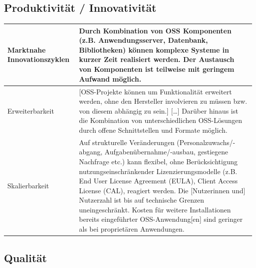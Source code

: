 \documentclass[a4paper]{scrartcl}
\begin{document}
\subsection{Produktivität / Innovativität}

\begin{supertabular}{|m{1.8900598in}m{4.77126in}|}

\hline

Marktnahe Innovationszyklen &

Durch Kombination von OSS Komponenten (z.B. Anwendungsserver, Datenbank,
Bibliotheken) können komplexe Systeme in kurzer Zeit realisiert werden. Der
Austausch von Komponenten ist teilweise mit geringem
Aufwand möglich.\\

\hline

Erweiterbarkeit &

[OSS-Projekte können um Funktionalität erweitert werden, ohne den Hersteller
involvieren zu müssen bzw.  von diesem abhängig zu sein.]  [\ldots] Darüber
hinaus ist die Kombination von unterschiedlichen OSS-Lösungen durch offene
Schnittstellen und Formate möglich.\\

\hline

Skalierbarkeit &

Auf strukturelle Veränderungen (Personalzuwachs/-abgang,
Aufgabenübernahme/-ausbau, gestiegene Nachfrage etc.) kann flexibel, ohne
Berücksichtigung nutzungseinschränkender Lizenzierungsmodelle (z.B. End User
License Agreement (EULA), Client Access License (CAL), reagiert werden. Die
[Nutzerinnen und] Nutzerzahl ist bis auf technische Grenzen
uneingeschränkt. Kosten für weitere Installationen bereits eingeführter
OSS-Anwendung[en] sind geringer als bei proprietären Anwendungen.\\

\hline
\end{supertabular}

\subsection{Qualität}
\end{document}
